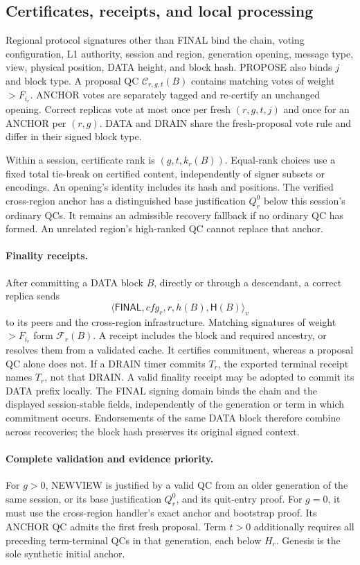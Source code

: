\documentclass[11pt,a4paper]{article}
\newcommand{\QC}{\mathcal C}
\newcommand{\FC}{\mathcal F}
\newcommand{\Hash}{\mathsf H}
\newcommand{\tagg}[1]{\ensuremath{\mathsf{#1}}}
\newcounter{protocol}
\begin{document}
\subsection{Certificates, receipts, and local processing}
Regional protocol signatures other than FINAL bind the chain, voting configuration, L1 authority,
session and region, generation opening, message type, view, physical
position, DATA height, and block hash. PROPOSE also binds $j$ and block
type. A proposal QC $\QC_{r,g,t}(B)$ contains matching votes of weight
$>F_{i_r}$. ANCHOR votes are separately tagged and re-certify an unchanged
opening. Correct replicas vote at most once per fresh $(r,g,t,j)$ and
once for an ANCHOR per $(r,g)$. DATA and DRAIN share the fresh-proposal
vote rule and differ in their signed block type.

Within a session, certificate rank is $(g,t,k_r(B))$. Equal-rank choices
use a fixed total tie-break on certified content, independently of signer
subsets or encodings. An opening's identity includes its hash and positions.
The verified cross-region anchor has a distinguished base justification
$Q_r^0$ below this session's ordinary QCs. It remains an admissible
recovery fallback if no ordinary QC has formed. An unrelated region's high-ranked QC
cannot replace that anchor.

\paragraph{Finality receipts.}
After committing a DATA block $B$, directly or through a descendant,
a correct replica sends
\[
 \langle\tagg{FINAL},\mathit{cfg}_r,r,h(B),\Hash(B)\rangle_v
\]
to its peers and the cross-region infrastructure. Matching signatures of
weight $>F_{i_r}$ form $\FC_r(B)$. A receipt includes the block and required
ancestry, or resolves them from a validated cache. It certifies commitment,
whereas a proposal QC alone does not. If a DRAIN timer commits $T_r$,
the exported terminal receipt names $T_r$, not that DRAIN.
A valid finality receipt may be adopted to commit its DATA prefix locally.
The FINAL signing domain binds the chain and the displayed session-stable
fields, independently of the generation or term in which commitment
occurs. Endorsements of the same DATA block therefore combine across
recoveries; the block hash preserves its original signed context.

\paragraph{Complete validation and evidence priority.}
For $g>0$, NEWVIEW is justified by a valid QC from an older generation
of the same session, or its base justification $Q_r^0$, and its quit-entry
proof. For $g=0$, it must use the
cross-region handler's exact anchor and bootstrap proof. Its ANCHOR QC
admits the first fresh proposal. Term $t>0$ additionally requires all
preceding term-terminal QCs in that generation, each below $H_r$.
Genesis is the sole synthetic initial anchor.
\end{document}
